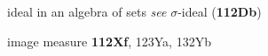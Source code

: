 

















































































\indexmedskip

ideal in an algebra of sets  
  {\it see} $\sigma$-ideal ({\bf 112Db})




















image measure {\bf 112Xf}, 123Ya, 132Yb





























